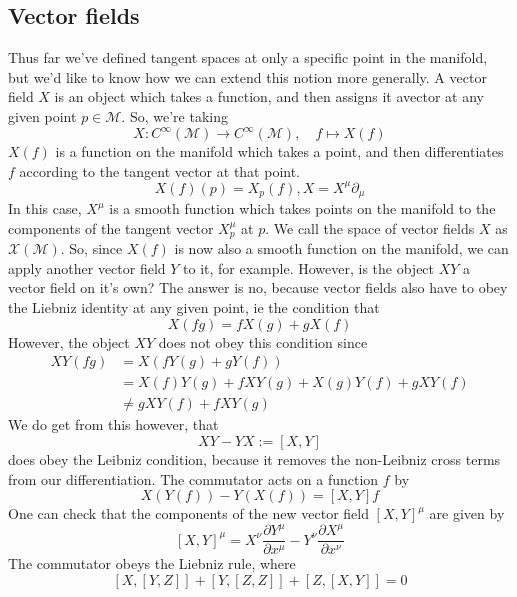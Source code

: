 \documentclass[11pt, a4paper]{article}   	%
\theoremstyle{slplain}
\begin{document}
\subsection{Vector fields} 
Thus far we've defined tangent spaces at only a specific point in the manifold, but we'd like to know how we can extend this notion more generally. A vector field $X$ is an object which takes a function, and then assigns it avector at any given point $p \in \mathcal{M}$. So, we're taking 
\[ 
X: C^\infty ( \mathcal{ M} ) \rightarrow C^\infty( \mathcal{M} ), \quad f \mapsto X(f) 
\]
$X(f)$ is a function on the manifold which takes a point, and then differentiates $f$ according to the tangent vector at that point. 
\[ 
X(f)( p) = X_p ( f), X = X^\mu \partial_\mu 
\] 
In this case, $X^\mu$ is a smooth function which takes points on the manifold to the components of the tangent vector $X_p^\mu$ at $p$. We call the space of vector fields $X$ as $\mathcal{ X} (\mathcal{M}) $.  
So, since $X(f)$ is now also a smooth function on the manifold, we can apply another vector field $Y$ to it, for example. However, is the object $XY$ a vector field on it's own? The answer is no, because vector fields also have to obey the Liebniz identity at any given point, ie the condition that 
\[ 
X(fg) = f X(g) + g X( f) 
\] 
However, the object $ XY$ does not obey this condition since 
\begin{align*} 
XY( fg )& = X ( f Y (g) + g Y ( f) ) \\
	&= X(f) Y(g) + f XY ( g) + X( g) Y(f) + g XY( f) \\ 
	& \neq g XY ( f) + f XY ( g) 
\end{align*} 
We do get from this however, that 
\[ 
XY  - YX := [ X, Y ] 
\]  
does obey the Leibniz condition, because it removes the non-Leibniz cross terms from our differentiation. The commutator acts on a function $f$ by 
\[ 
X( Y (  f))  - Y( X( f)) = [ X, Y] f 
\] One can check that the components of the new vector field $[ X, Y]^\mu $ are given by 
\[ 
[ X, Y]^\mu = X^\nu \frac{\partial Y^\mu}{ \partial x^\mu }  - Y^\nu \frac{ \partial X^\mu }{ \partial x^\nu } 
\]
The commutator obeys the Liebniz rule, where 
\[ 
[X , [ Y, Z]] + [ Y, [ Z, Z]] + [Z, [ X, Y]] = 0
\] 
\end{document}
